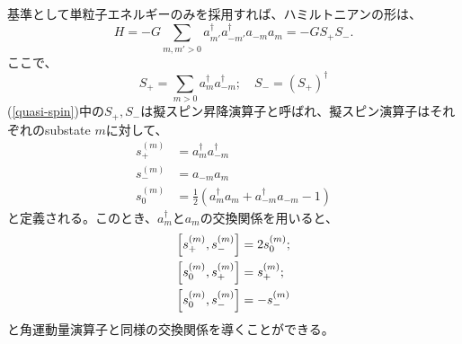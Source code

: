 \documentclass[a4paper,11pt]{jsreport}
\begin{document}
  基準として単粒子エネルギーのみを採用すれば、ハミルトニアンの形は、
  \begin{equation}
    H=-G\sum_{m,m'>0}a^{\dagger}_{m'}a^{\dagger}_{-m'}a_{-m}a_{m}=-GS_{+}S_{-}.
  \end{equation}
  ここで、
  \begin{equation}
    S_{+}=\sum_{m>0}a^{\dagger}_{m}a^{\dagger}_{-m};\quad S_{-}=(S_{+})^{\dagger}\label{quasi-spin}
  \end{equation}
  (\ref{quasi-spin})中の\(S_{+},S_{-}\)は擬スピン昇降演算子と呼ばれ、擬スピン演算子はそれぞれのsubstate \(m\)に対して、
  \begin{align}
    s^{(m)}_+ &= a^{\dagger}_{m}a^{\dagger}_{-m}\\
    s^{(m)}_- &= a_{-m}a_{m}\\
    s^{(m)}_0 &= \frac{1}{2}\left(a^{\dagger}_{m}a_{m}+a^{\dagger}_{-m}a_{-m}-1\right)
  \end{align}
  と定義される。このとき、\(a^{\dagger}_{m}\)と\(a_{m}\)の交換関係を用いると、
  \begin{align}
    \comm{s^{(m)}_+}{s^{(m)}_-} &= 2s^{(m)}_0;\\
    \comm{s^{(m)}_0}{s^{(m)}_+} &= s^{(m)}_+;\\
    \comm{s^{(m)}_0}{s^{(m)}_-} &= -s^{(m)}_-
  \end{align}
  と角運動量演算子と同様の交換関係を導くことができる。
\end{document}
